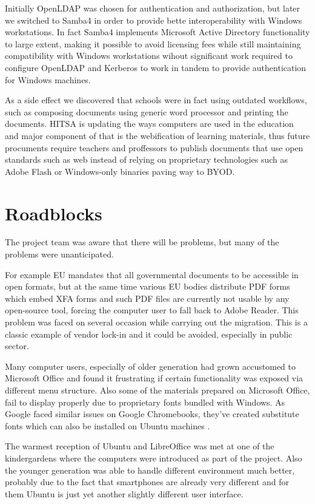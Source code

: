 \documentclass{article}
\begin{document}
Initially OpenLDAP was chosen for authentication and authorization,
but later we switched to Samba4 in order to provide bette
interoperability with Windows workstations.
In fact Samba4 implements Microsoft Active Directory functionality
to large extent,
making it possible to avoid licensing fees while still maintaining
compatibility with Windows workstations wihout
significant work required to configure OpenLDAP and Kerberos to
work in tandem to provide authentication for Windows machines.

As a side effect we discovered that schools were in fact
using outdated workflows, such as composing documents using
generic word processor and printing the documents.
HITSA is updating the ways computers are used in the education
and major component of that is the webification of 
learning materials, thus future procuments require
teachers and proffessors to publish documents that
use open standards such as web instead of relying on
proprietary technologies such as Adobe Flash or
Windows-only binaries paving way to BYOD.

\section{Roadblocks}

The project team was aware that there will be problems,
but many of the problems were unanticipated.

For example EU mandates that all governmental documents to
be accessible in open formats, but at the same time
various EU bodies distribute PDF forms which
embed XFA forms and such PDF files are currently not
usable by any open-source tool, forcing the computer
user to fall back to Adobe Reader.
This problem was faced on several occasion while
carrying out the migration.
This is a classic example of vendor lock-in and
it could be avoided, especially in public sector.

Many computer users, especially of older generation
had grown accustomed to 
Microsoft Office and found it frustrating
if certain functionality was exposed
via different menu structure.
Also some of the materials prepared on Microsoft Office,
fail to display properly due to proprietary fonts
bundled with Windows.
As Google faced similar issues on Google Chromebooks,
they've created substitute fonts which can also be installed
on Ubuntu machines \cite{substituting-fonts}.

The warmest reception of Ubuntu and LibreOffice
was met at one of the kindergardens where the computers were
introduced as part of the project.
Also the younger generation was able to handle
different environment much better,
probably due to the fact that smartphones
are already very different and for them Ubuntu
is just yet another slightly different user interface.
\end{document}
